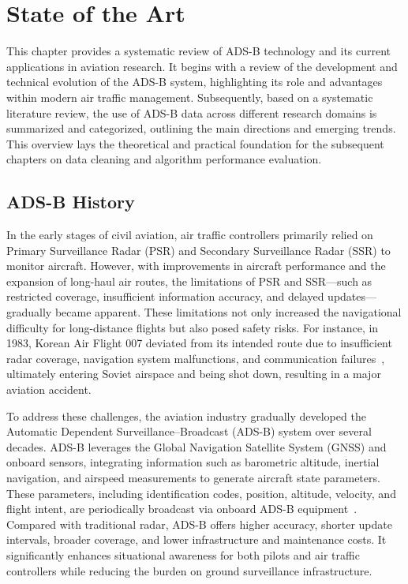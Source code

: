 \section{State of the Art}

This chapter provides a systematic review of ADS-B technology and its current applications in aviation research. It begins with a review of the development and technical evolution of the ADS-B system, highlighting its role and advantages within modern air traffic management. Subsequently, based on a systematic literature review, the use of ADS-B data across different research domains is summarized and categorized, outlining the main directions and emerging trends. This overview lays the theoretical and practical foundation for the subsequent chapters on data cleaning and algorithm performance evaluation.


\subsection{ADS-B History}
In the early stages of civil aviation, air traffic controllers primarily relied on Primary Surveillance Radar (PSR) and Secondary Surveillance Radar (SSR) to monitor aircraft. However, with improvements in aircraft performance and the expansion of long-haul air routes, the limitations of PSR and SSR—such as restricted coverage, insufficient information accuracy, and delayed updates—gradually became apparent. These limitations not only increased the navigational difficulty for long-distance flights but also posed safety risks. For instance, in 1983, Korean Air Flight 007 deviated from its intended route due to insufficient radar coverage, navigation system malfunctions, and communication failures~\cite{icao_1993}, ultimately entering Soviet airspace and being shot down, resulting in a major aviation accident.

To address these challenges, the aviation industry gradually developed the Automatic Dependent Surveillance–Broadcast (ADS-B) system over several decades. ADS-B leverages the Global Navigation Satellite System (GNSS) and onboard sensors, integrating information such as barometric altitude, inertial navigation, and airspeed measurements to generate aircraft state parameters. These parameters, including identification codes, position, altitude, velocity, and flight intent, are periodically broadcast via onboard ADS-B equipment~\cite{olive2024filtering}. Compared with traditional radar, ADS-B offers higher accuracy, shorter update intervals, broader coverage, and lower infrastructure and maintenance costs. It significantly enhances situational awareness for both pilots and air traffic controllers while reducing the burden on ground surveillance infrastructure.

